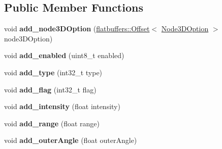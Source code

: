 \subsection*{Public Member Functions}
\begin{DoxyCompactItemize}
\item 
\mbox{\label{structflatbuffers_1_1Light3DOptionBuilder_ad6bf082190e8676298a068df266a5339}} 
void {\bfseries add\+\_\+node3\+D\+Option} (\hyperlink{structflatbuffers_1_1Offset}{flatbuffers\+::\+Offset}$<$ \hyperlink{structflatbuffers_1_1Node3DOption}{Node3\+D\+Option} $>$ node3\+D\+Option)
\item 
\mbox{\label{structflatbuffers_1_1Light3DOptionBuilder_a0ddf5efff2d3961ccdbbe5df37ed0795}} 
void {\bfseries add\+\_\+enabled} (uint8\+\_\+t enabled)
\item 
\mbox{\label{structflatbuffers_1_1Light3DOptionBuilder_a990bfcac08e82da3b0971341d52df8c4}} 
void {\bfseries add\+\_\+type} (int32\+\_\+t type)
\item 
\mbox{\label{structflatbuffers_1_1Light3DOptionBuilder_afce23dc70a01ca39497c73625655d065}} 
void {\bfseries add\+\_\+flag} (int32\+\_\+t flag)
\item 
\mbox{\label{structflatbuffers_1_1Light3DOptionBuilder_af5b3308db80f031cce7846b6c601ce39}} 
void {\bfseries add\+\_\+intensity} (float intensity)
\item 
\mbox{\label{structflatbuffers_1_1Light3DOptionBuilder_a255527f0b7b1e52cbd334824b628f46f}} 
void {\bfseries add\+\_\+range} (float range)
\item 
\mbox{\label{structflatbuffers_1_1Light3DOptionBuilder_abd958355223ac1c98798a69c2c751f50}} 
void {\bfseries add\+\_\+outer\+Angle} (float outer\+Angle)
\item 
\mbox{\label{structflatbuffers_1_1Light3DOptionBuilder_af180a3f10903e8024347ee18d2b14a6d}} 

\end{DoxyCompactItemize}
